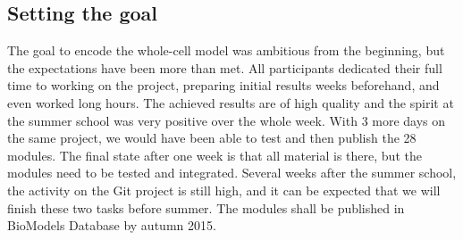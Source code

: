 \documentclass[journal,transmag]{IEEEtran}
\begin{document}
\subsection{Setting the goal}
The goal to encode the whole-cell model was ambitious from the beginning, but the expectations have been more than met. 
All participants dedicated their full time to working on the project, preparing initial results weeks beforehand, and even worked long hours. 
The achieved results are of high quality and the spirit at the summer school was very positive over the whole week. 
With 3 more days on the same project, we would have been able to test and then publish the 28 modules. 
The final state after one week is that all material is there, but the modules need to be tested and integrated. 
Several weeks after the summer school, the activity on the Git project is still high, and it can be expected that we will finish these two tasks before summer. 
The modules shall be published in BioModels Database by autumn 2015. 
\end{document}

